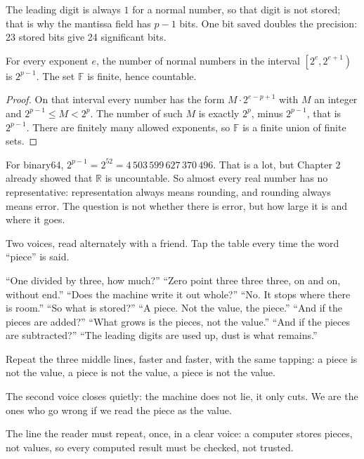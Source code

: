 The leading digit is always $1$ for a normal number, so that digit is not stored;
that is why the mantissa field has $p-1$ bits. One bit saved doubles the precision:
23 stored bits give 24 significant
bits.



\begin{teorema}
For every exponent $e$, the number of normal numbers in the interval
$\left[2^{e},2^{e+1}\right)$ is $2^{p-1}$. The set $\mathbb{F}$ is finite, hence
countable.
\end{teorema}

\begin{proof}
On that interval every number has the form $M\cdot2^{e-p+1}$ with $M$ an integer
and $2^{p-1}\le M<2^{p}$. The number of such $M$ is exactly $2^{p}$, minus
$2^{p-1}$, that is $2^{p-1}$. There are finitely many allowed exponents, so
$\mathbb{F}$ is a finite union of finite sets.
\end{proof}

For binary64, $2^{p-1}=2^{52}=4\,503\,599\,627\,370\,496$. That is a lot, but Chapter 2
already showed that $\mathbb{R}$ is uncountable. So almost every real number has no
representative: representation always means rounding, and rounding always means
error. The question is not whether there is error, but how large it is and where it
goes.

\begin{bacakeras}
Two voices, read alternately with a friend. Tap the table every time the word ``piece''
is said.

``One divided by three, how much?'' ``Zero point three three three, on and on, without
end.'' ``Does the machine write it out whole?'' ``No. It stops where there is room.''
``So what is stored?'' ``A piece. Not the value, the piece.''
``And if the pieces are added?'' ``What grows is the pieces, not the value.''
``And if the pieces are subtracted?'' ``The leading digits are used up, dust is what
remains.''

Repeat the three middle lines, faster and faster, with the same tapping: a piece is not
the value, a piece is not the value, a piece is not the value.

The second voice closes quietly: the machine does not lie, it only cuts. We are the ones
who go wrong if we read the piece as the value.

The line the reader must repeat, once, in a clear voice: a computer stores pieces, not
values, so every computed result must be checked, not trusted.
\end{bacakeras}

